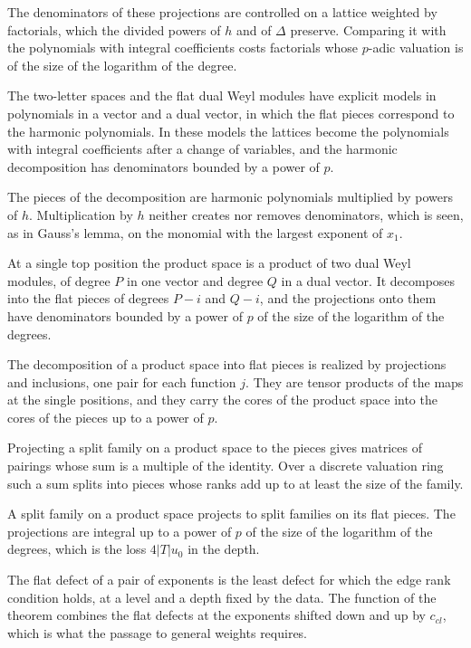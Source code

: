 The denominators of these projections are controlled on a lattice weighted by factorials, which the
divided powers of $h$ and of $\Delta$ preserve. Comparing it with the polynomials with integral
coefficients costs factorials whose $p$-adic valuation is of the size of the logarithm of the degree.

The two-letter spaces and the flat dual Weyl modules have explicit models in polynomials in a vector
and a dual vector, in which the flat pieces correspond to the harmonic polynomials. In these models
the lattices become the polynomials with integral coefficients after a change of variables, and the
harmonic decomposition has denominators bounded by a power of $p$.

The pieces of the decomposition are harmonic polynomials multiplied by powers of $h$. Multiplication
by $h$ neither creates nor removes denominators, which is seen, as in Gauss's lemma, on the monomial
with the largest exponent of $x_1$.

At a single top position the product space is a product of two dual Weyl modules, of degree $P$ in
one vector and degree $Q$ in a dual vector. It decomposes into the flat pieces of degrees $P-i$ and
$Q-i$, and the projections onto them have denominators bounded by a power of $p$ of the size of the
logarithm of the degrees.

The decomposition of a product space into flat pieces is realized by projections and inclusions, one
pair for each function $j$. They are tensor products of the maps at the single positions, and they
carry the cores of the product space into the cores of the pieces up to a power of $p$.

Projecting a split family on a product space to the pieces gives matrices of pairings whose sum is a
multiple of the identity. Over a discrete valuation ring such a sum splits into pieces whose ranks
add up to at least the size of the family.

A split family on a product space projects to split families on its flat pieces. The projections
are integral up to a power of $p$ of the size of the logarithm of the degrees, which is the loss
$4|T|u_0$ in the depth.

The flat defect of a pair of exponents is the least defect for which the edge rank condition
holds, at a level and a depth fixed by the data. The function of the theorem combines the flat
defects at the exponents shifted down and up by $c_{cl}$, which is what the passage to general
weights requires.

